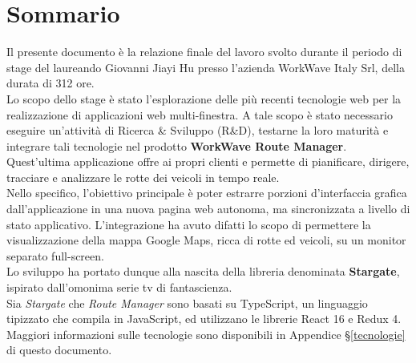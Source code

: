 
\cleardoublepage
{}
{}
\begingroup

\chapter*{Sommario}

Il presente documento è la relazione finale del lavoro svolto durante il periodo di stage del laureando Giovanni Jiayi Hu presso l'azienda WorkWave Italy Srl, della durata di 312 ore. \\

Lo scopo dello stage è stato l'esplorazione delle più recenti tecnologie web per la realizzazione di applicazioni web multi-finestra. A tale scopo è stato necessario eseguire un'attività di Ricerca \& Sviluppo (R\&D), testarne la loro maturità e integrare tali tecnologie nel prodotto \textbf{WorkWave Route Manager}. Quest'ultima applicazione offre ai propri clienti e permette di pianificare, dirigere, tracciare e analizzare le rotte dei  veicoli in tempo reale. \\

Nello specifico, l'obiettivo principale è poter estrarre porzioni d'interfaccia grafica dall'applicazione in una nuova pagina web autonoma, ma sincronizzata a livello di stato applicativo. L'integrazione ha avuto difatti lo scopo di permettere la visualizzazione della mappa Google Maps, ricca di rotte ed veicoli, su un monitor separato full-screen. \\

Lo sviluppo ha portato dunque alla nascita della libreria denominata \textbf{Stargate}, ispirato dall'omonima serie tv di fantascienza. \\

Sia \textit{Stargate} che \textit{Route Manager} sono basati su TypeScript, un linguaggio tipizzato che compila in JavaScript, ed utilizzano le librerie React 16 e Redux 4. Maggiori informazioni sulle tecnologie sono disponibili in Appendice §\ref{tecnologie} di questo documento.

%
%

\endgroup			

\vfill

